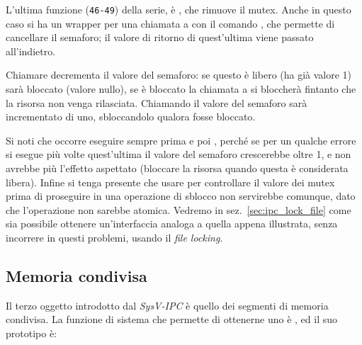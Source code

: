 L'ultima funzione (\texttt{\small 46-49}) della serie, è ,
che rimuove il mutex. Anche in questo caso si ha un wrapper per una chiamata a
 con il comando , che permette di cancellare il
semaforo; il valore di ritorno di quest'ultima viene passato all'indietro.

Chiamare  decrementa il valore del semaforo: se questo è
libero (ha già valore 1) sarà bloccato (valore nullo), se è bloccato la
chiamata a  si bloccherà fintanto che la risorsa non venga
rilasciata. Chiamando  il valore del semaforo sarà
incrementato di uno, sbloccandolo qualora fosse bloccato.  

Si noti che occorre eseguire sempre prima  e poi
, perché se per un qualche errore si esegue più volte
quest'ultima il valore del semaforo crescerebbe oltre 1, e 
non avrebbe più l'effetto aspettato (bloccare la risorsa quando questa è
considerata libera).  Infine si tenga presente che usare  per
controllare il valore dei mutex prima di proseguire in una operazione di
sblocco non servirebbe comunque, dato che l'operazione non sarebbe atomica.
Vedremo in sez.~\ref{sec:ipc_lock_file} come sia possibile ottenere
un'interfaccia analoga a quella appena illustrata, senza incorrere in questi
problemi, usando il \textit{file locking}.


\subsection{Memoria condivisa}
\label{sec:ipc_sysv_shm}

Il terzo oggetto introdotto dal \textit{SysV-IPC} è quello dei segmenti di
memoria condivisa. La funzione di sistema che permette di ottenerne uno è
, ed il suo prototipo è:


